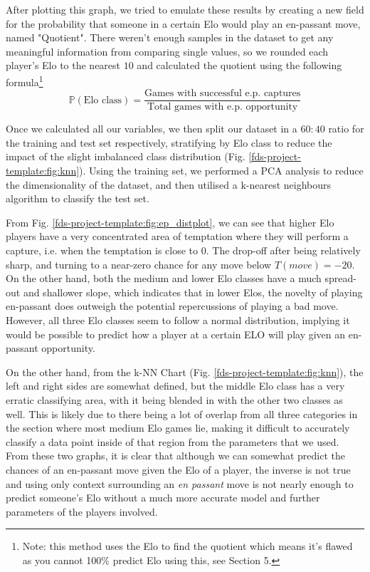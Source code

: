 \documentclass[10pt,a4paper]{article}
\begin{document}
\begin{multicols}{2}
After plotting this graph, we tried to emulate these results by creating a new field for the probability that someone in a certain Elo would play an en-passant move, named "Quotient". There weren't enough samples in the dataset to get any meaningful information from comparing single values, so we rounded each player's Elo to the nearest $10$ and calculated the quotient using the following formula\footnote[1]{Note: this method uses the Elo to find the quotient which means it's flawed as you cannot 100\% predict Elo using this, see Section 5.}
$$\mathbb{P}(\text{Elo class}) = \frac{\text{Games with successful e.p. captures}}{\text{Total games with e.p. opportunity}}$$

Once we calculated all our variables, we then split our dataset in a $60:40$ ratio for the training and test set respectively, stratifying by Elo class to reduce the impact of the slight imbalanced class distribution (Fig. \ref{fds-project-template:fig:knn}). Using the training set, we performed a PCA analysis to reduce the dimensionality of the dataset, and then utilised a k-nearest neighbours algorithm to classify the test set.\newline

From Fig. \ref{fds-project-template:fig:ep_distplot}, we can see that higher Elo players have a very concentrated area of temptation where they will perform a capture, i.e. when the temptation is close to $0$. The drop-off after being relatively sharp, and turning to a near-zero chance for any move below $T(move)=-20$. On the other hand, both the medium and lower Elo classes have a much spread-out and shallower slope, which indicates that in lower Elos, the novelty of playing en-passant does outweigh the potential repercussions of playing a bad move. However, all three Elo classes seem to follow a normal distribution, implying it would be possible to predict how a player at a certain ELO will play given an en-passant opportunity.\newline

On the other hand, from the k-NN Chart (Fig. \ref{fds-project-template:fig:knn}), the left and right sides are somewhat defined, but the middle Elo class has a very erratic classifying area, with it being blended in with the other two classes as well. This is likely due to there being a lot of overlap from all three categories in the section where most medium Elo games lie, making it difficult to accurately classify a data point inside of that region from the parameters that we used. From these two graphs, it is clear that although we can somewhat predict the chances of an en-passant move given the Elo of a player, the inverse is not true and using only context surrounding an \textit{en passant} move is not nearly enough to predict someone's Elo without a much more accurate model and further parameters of the players involved. \newline


\end{multicols}
\end{document}
